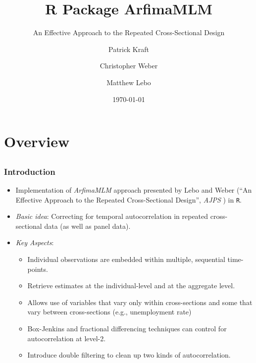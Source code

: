 \documentclass{beamer}\usepackage[]{graphicx}\usepackage[]{color}
\author[Kraft, Weber, Lebo]{Patrick Kraft \and
Christopher Weber \and
Matthew Lebo}
\institute{Stony Brook University \and
University of Arizona}
\title{R Package ArfimaMLM}
\subtitle{An Effective Approach to the Repeated Cross-Sectional Design}
\date{\today}
\begin{document}
\frame{\titlepage}

\section{Overview}
\subsection{}
\begin{frame}%
\frametitle{Introduction}
\begin{itemize}
\item Implementation of \emph{ArfimaMLM} approach presented by Lebo and Weber (``An Effective Approach to the Repeated Cross-Sectional Design'', \textit{AJPS} \citeyear{lebo2015effective}) in \texttt{R}.
\item \emph{Basic idea}: Correcting for temporal autocorrelation in repeated cross-sectional data (as well as panel data).
\item \emph{Key Aspects}:
\begin{itemize}
\item Individual observations are embedded within multiple, sequential time-points.
\item Retrieve estimates at the individual-level and at the aggregate level.
\item Allows use of variables that vary only within cross-sections and some that vary between cross-sections (e.g., unemployment rate)
\item Box-Jenkins and fractional differencing techniques can control for autocorrelation at level-2. \citep[e.g.][]{box1996dynamics,lebo2000you,clarke2003fractional}
\item Introduce double filtering to clean up two kinds of autocorrelation.
\end{itemize}
\end{itemize}
\end{frame}
\end{document}
